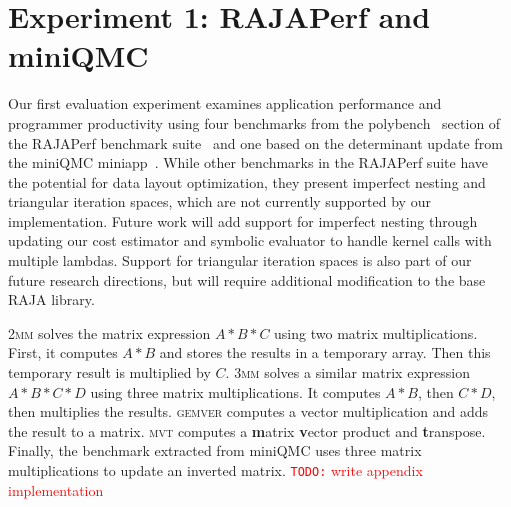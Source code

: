\documentclass[sigconf,review=true]{acmart}
\newcommand{\todo}[1]{{\textcolor{red}{{\tt{TODO:}}\,\,#1 }}}
\begin{document}
\section{Experiment 1: RAJAPerf and miniQMC}
\label{sec:eval}

Our first evaluation experiment examines application performance and programmer productivity using four benchmarks from the polybench~\cite{pouchet2012polybench} section of the RAJAPerf benchmark suite~\cite{hornung2017raja} and one based on the determinant update from the miniQMC miniapp~\cite{richards2018fy18}.
While other benchmarks in the RAJAPerf suite have the potential for data layout optimization, they present imperfect nesting and triangular iteration spaces, which are not currently supported by our implementation. 
Future work will add support for imperfect nesting through updating our cost estimator and symbolic evaluator to handle kernel calls with multiple lambdas. 
Support for triangular iteration spaces is also part of our future research directions, but will require additional modification to the base RAJA library.



\textsc{2mm} solves the matrix expression $A*B*C$ using two matrix multiplications. 
First, it computes $A*B$ and stores the results in a temporary array.
Then this temporary result is multiplied by $C$.
\textsc{3mm} solves a similar matrix expression $A*B*C*D$ using three matrix multiplications.
It computes $A*B$, then $C*D$, then multiplies the results.
\textsc{gemver} computes a vector multiplication and adds the result to a matrix. 
\textsc{mvt} computes a \textbf{m}atrix \textbf{v}ector product and \textbf{t}ranspose.
Finally, the benchmark extracted from miniQMC uses three matrix multiplications to update an inverted matrix. 
\todo{write appendix implementation}
\end{document}

